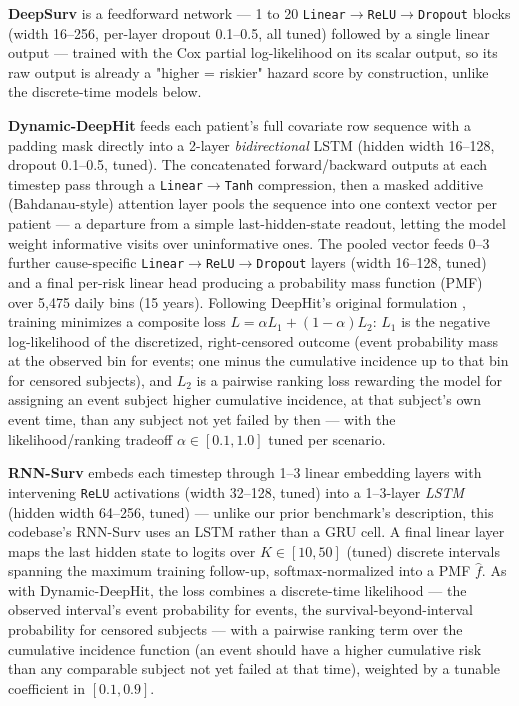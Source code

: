 \textbf{DeepSurv} \citep{katzman2018deepsurv} is a feedforward network — 1 to 20 \texttt{Linear}$\to$\texttt{ReLU}$\to$\texttt{Dropout} blocks (width 16--256, per-layer dropout 0.1--0.5, all tuned) followed by a single linear output — trained with the Cox partial log-likelihood on its scalar output, so its raw output is already a "higher = riskier" hazard score by construction, unlike the discrete-time models below.

\textbf{Dynamic-DeepHit} \citep{lee2020dynamicdeephit,lee2018deephit} feeds each patient's full covariate row sequence with a padding mask directly into a 2-layer \emph{bidirectional} LSTM (hidden width 16--128, dropout 0.1--0.5, tuned). The concatenated forward/backward outputs at each timestep pass through a \texttt{Linear}$\to$\texttt{Tanh} compression, then a masked additive (Bahdanau-style) attention layer pools the sequence into one context vector per patient — a departure from a simple last-hidden-state readout, letting the model weight informative visits over uninformative ones. The pooled vector feeds 0--3 further cause-specific \texttt{Linear}$\to$\texttt{ReLU}$\to$\texttt{Dropout} layers (width 16--128, tuned) and a final per-risk linear head producing a probability mass function (PMF) over 5{,}475 daily bins (15 years). Following DeepHit's original formulation \citep{lee2018deephit}, training minimizes a composite loss $L=\alpha L_1+(1-\alpha)L_2$: $L_1$ is the negative log-likelihood of the discretized, right-censored outcome (event probability mass at the observed bin for events; one minus the cumulative incidence up to that bin for censored subjects), and $L_2$ is a pairwise ranking loss rewarding the model for assigning an event subject higher cumulative incidence, at that subject's own event time, than any subject not yet failed by then — with the likelihood/ranking tradeoff $\alpha\in[0.1,1.0]$ tuned per scenario.

\textbf{RNN-Surv} \citep{giunchiglia2018rnn_surv} embeds each timestep through 1--3 linear embedding layers with intervening \texttt{ReLU} activations (width 32--128, tuned) into a 1--3-layer \emph{LSTM} (hidden width 64--256, tuned) — unlike our prior benchmark's description, this codebase's RNN-Surv uses an LSTM rather than a GRU cell. A final linear layer maps the last hidden state to logits over $K\in[10,50]$ (tuned) discrete intervals spanning the maximum training follow-up, softmax-normalized into a PMF $\hat{f}$. As with Dynamic-DeepHit, the loss combines a discrete-time likelihood — the observed interval's event probability for events, the survival-beyond-interval probability for censored subjects — with a pairwise ranking term over the cumulative incidence function (an event should have a higher cumulative risk than any comparable subject not yet failed at that time), weighted by a tunable coefficient in $[0.1,0.9]$.

